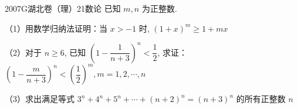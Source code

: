 
\begin{problem}{2007}{G}{湖北卷（理）}{21}{数论}
已知 $m,n$ 为正整数.

（1）用数学归纳法证明：当 $x>-1$ 时, $(1+x)^m \ge 1+mx$

（2）对于 $n \ge 6$, 已知 $\left(1-\dfrac{1}{n+3}\right)^n < \dfrac{1}{2}$, 求证：$\left(1-\dfrac{m}{n+3}\right)^n < \left(\dfrac{1}{2}\right)^m, m=1,2,\cdots,n$

（3）求出满足等式 $3^n+4^n+5^n+\cdots+(n+2)^n=(n+3)^n$ 的所有正整数 $n$
\end{problem}